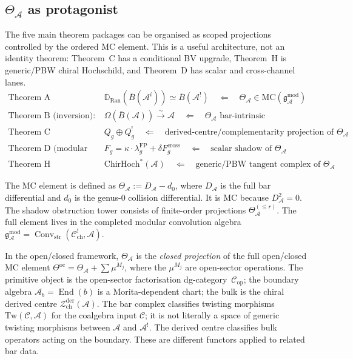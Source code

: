 \documentclass[11pt]{article}
\newcommand{\cA}{\mathcal{A}}
\newcommand{\cC}{\mathcal{C}}
\newcommand{\cZ}{\mathcal{Z}}
\newcommand{\B}{\bar{B}}
\newcommand{\bD}{\mathbb{D}}
\newcommand{\Ran}{\operatorname{Ran}}
\newcommand{\MC}{\mathrm{MC}}
\newcommand{\Convstr}{\operatorname{Conv}_{\mathrm{str}}}
\newcommand{\ChirHoch}{\mathrm{ChirHoch}}
\newcommand{\gAmod}{\mathfrak{g}^{\mathrm{mod}}_\cA}
\begin{document}
\subsection{$\Theta_\cA$ as protagonist}
\label{sec:theta-protagonist}

The five main theorem packages can be organised as scoped
projections controlled by the ordered MC element.  This is a
useful architecture, not an identity theorem: Theorem~C has a
conditional BV upgrade, Theorem~H is generic/PBW chiral
Hochschild, and Theorem~D has scalar and cross-channel lanes.
\begin{align*}
\text{Theorem A (Verdier/Koszul):}\qquad
  & \bD_{\Ran}(\B(\cA^i)) \simeq \B(\cA^!)
    \quad\Longleftarrow\quad
    \Theta_\cA \in \MC(\gAmod) \\
\text{Theorem B (inversion):}\qquad
  & \Omega(\B(\cA)) \xrightarrow{\sim} \cA
    \quad\Longleftarrow\quad
    \Theta_\cA \text{ bar-intrinsic} \\
\text{Theorem C (complementarity):}\qquad
  & Q_g \oplus Q_g^!
    \quad\Longleftarrow\quad
    \text{derived-centre/complementarity projection of }
    \Theta_\cA \\
\text{Theorem D (modular char.):}\qquad
  & F_g = \kappa \cdot \lambda_g^{\mathrm{FP}}
    + \delta F_g^{\mathrm{cross}}
    \quad\Longleftarrow\quad
    \text{scalar shadow of } \Theta_\cA \\
\text{Theorem H (Hochschild):}\qquad
  & \ChirHoch^*(\cA)
    \quad\Longleftarrow\quad
    \text{generic/PBW tangent complex of } \Theta_\cA
\end{align*}

The MC element is defined as $\Theta_\cA := D_\cA - d_0$,
where $D_\cA$ is the full bar differential and $d_0$ is the
genus-$0$ collision differential.  It is MC because
$D_\cA^2 = 0$.  The shadow obstruction tower consists of
finite-order projections $\Theta_\cA^{(\leq r)}$.  The full
element lives in the completed modular convolution algebra
$\gAmod = \Convstr(\cC^!_{\mathrm{ch}}, \cA)$.

In the open/closed framework, $\Theta_\cA$ is the
\emph{closed projection} of the full open/closed MC element
$\Theta^{\mathrm{oc}} = \Theta_\cA + \sum \mu^{M_j}$,
where the $\mu^{M_j}$ are open-sector operations.  The
primitive object is the open-sector factorisation
dg-category~$\cC_{\mathrm{op}}$; the boundary algebra
$\cA_b = \operatorname{End}(b)$ is a Morita-dependent chart;
the bulk is the chiral derived centre
$\cZ^{\mathrm{der}}_{\mathrm{ch}}(\cA)$.  The bar complex
classifies twisting morphisms $\mathrm{Tw}(\cC,\cA)$ for the
coalgebra input $\cC$; it is not literally a space of generic
twisting morphisms between $\cA$ and $\cA^!$.  The derived centre
classifies bulk operators acting on the boundary.  These are
different functors applied to related bar data.
\end{document}
